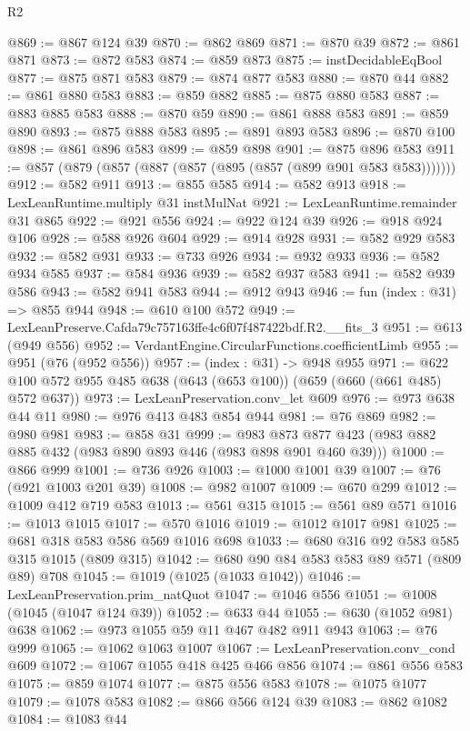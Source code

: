\begin{lexlean}{R2}
\begin{coremodule}
@869 := @867 @124 @39
@870 := @862 @869
@871 := @870 @39
@872 := @861 @871
@873 := @872 @583
@874 := @859 @873
@875 := instDecidableEqBool
@877 := @875 @871 @583
@879 := @874 @877 @583
@880 := @870 @44
@882 := @861 @880 @583
@883 := @859 @882
@885 := @875 @880 @583
@887 := @883 @885 @583
@888 := @870 @59
@890 := @861 @888 @583
@891 := @859 @890
@893 := @875 @888 @583
@895 := @891 @893 @583
@896 := @870 @100
@898 := @861 @896 @583
@899 := @859 @898
@901 := @875 @896 @583
@911 := @857 (@879 (@857 (@887 (@857 (@895 (@857 (@899 @901 @583 @583)))))))
@912 := @582 @911
@913 := @855 @585
@914 := @582 @913
@918 := LexLeanRuntime.multiply @31 instMulNat
@921 := LexLeanRuntime.remainder @31 @865
@922 := @921 @556
@924 := @922 @124 @39
@926 := @918 @924 @106
@928 := @588 @926 @604
@929 := @914 @928
@931 := @582 @929 @583
@932 := @582 @931
@933 := @733 @926
@934 := @932 @933
@936 := @582 @934 @585
@937 := @584 @936
@939 := @582 @937 @583
@941 := @582 @939 @586
@943 := @582 @941 @583
@944 := @912 @943
@946 := fun (index : @31) => @855 @944
@948 := @610 @100 @572
@949 := LexLeanPreserve.Cafda79c757163ffe4c6f07f487422bdf.R2.__fits_3
@951 := @613 (@949 @556)
@952 := VerdantEngine.CircularFunctions.coefficientLimb
@955 := @951 (@76 (@952 @556))
@957 := (index : @31) -> @948 @955
@971 := @622 @100 @572 @955 @485 @638 (@643 (@653 @100)) (@659 (@660 (@661 @485) @572 @637))
@973 := LexLeanPreservation.conv_let @609
@976 := @973 @638 @44 @11
@980 := @976 @413 @483 @854 @944
@981 := @76 @869
@982 := @980 @981
@983 := @858 @31
@999 := @983 @873 @877 @423 (@983 @882 @885 @432 (@983 @890 @893 @446 (@983 @898 @901 @460 @39)))
@1000 := @866 @999
@1001 := @736 @926
@1003 := @1000 @1001 @39
@1007 := @76 (@921 @1003 @201 @39)
@1008 := @982 @1007
@1009 := @670 @299
@1012 := @1009 @412 @719 @583
@1013 := @561 @315
@1015 := @561 @89 @571
@1016 := @1013 @1015
@1017 := @570 @1016
@1019 := @1012 @1017 @981
@1025 := @681 @318 @583 @586 @569 @1016 @698
@1033 := @680 @316 @92 @583 @585 @315 @1015 (@809 @315)
@1042 := @680 @90 @84 @583 @583 @89 @571 (@809 @89) @708
@1045 := @1019 (@1025 (@1033 @1042))
@1046 := LexLeanPreservation.prim_natQuot
@1047 := @1046 @556
@1051 := @1008 (@1045 (@1047 @124 @39))
@1052 := @633 @44
@1055 := @630 (@1052 @981) @638
@1062 := @973 @1055 @59 @11 @467 @482 @911 @943
@1063 := @76 @999
@1065 := @1062 @1063 @1007
@1067 := LexLeanPreservation.conv_cond @609
@1072 := @1067 @1055 @418 @425 @466 @856
@1074 := @861 @556 @583
@1075 := @859 @1074
@1077 := @875 @556 @583
@1078 := @1075 @1077
@1079 := @1078 @583
@1082 := @866 @566 @124 @39
@1083 := @862 @1082
@1084 := @1083 @44

\end{coremodule}
\end{lexlean}
